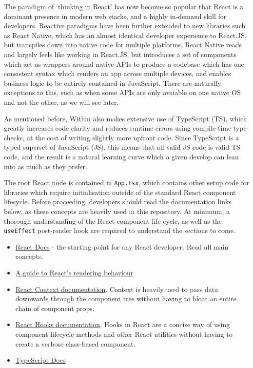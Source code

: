 The paradigm of `thinking in React' has now become so popular that React is a dominant presence in modern web stacks, and a highly in-demand skill for developers. Reactive paradigms have been further extended to new libraries such as React Native, which has an almost identical developer experience to React.JS, but transpiles down into native code for multiple platforms. React Native reads and largely feels like working in React.JS, but introduces a set of components which act as wrappers around native APIs to produce a codebase which has one consistent syntax which renders an app across multiple devices, and enables business logic to be entirely contained in JavaScript. There are naturally exceptions to this, such as when some APIs are only avaiable on one native OS and not the other, as we will see later.

As mentioned before, Within also makes extensive use of TypeScript (TS), which greatly increases code clarity and reduces runtime errors using compile-time type-checks, at the cost of writing slightly more upfront code. Since TypeScript is a typed superset of JavaScript (JS), this means that all valid JS code is valid TS code, and the result is a natural learning curve which a given develop can lean into as much as they prefer.

The root React node is contained in \texttt{App.tsx}, which contains other setup code for libraries which require initialisation outside of the standard React component lifecycle. Before proceeding, developers should read the documentation links below, as these concepts are heavily used in this repository. At minimum, a thorough understanding of the React component life cycle, as well as the \texttt{useEffect} post-render hook are required to understand the sections to come.

\begin{itemize}
    \item \href{https://reactjs.org/docs/hello-world.html}{React Docs} - the starting point for any React developer. Read all main concepts.
    \item \href{https://blog.isquaredsoftware.com/2020/05/blogged-answers-a-mostly-complete-guide-to-react-rendering-behavior/#rendering-process-overview}{A guide to React's rendering behaviour}
    \item \href{https://reactjs.org/docs/context.html}{React Context documentation}. Context is heavily used to pass data downwards through the component tree without having to bloat an entire chain of component props.
    \item \href{https://reactjs.org/docs/hooks-intro.html}{React Hooks documentation}. Hooks in React are a concise way of using component lifecycle methods and other React utilities without having to create a verbose class-based component.
    \item \href{https://www.TypeScriptlang.org/docs/}{TypeScript Docs}
\end{itemize}

